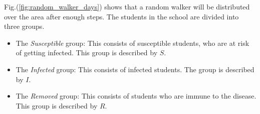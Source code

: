 \documentclass[%
twoside,                 %
final,                   %
chapterprefix=true,      %
open=right               %
10pt]{book}
\begin{document}
Fig.(\ref{fig:random_walker_days}) shows that a random walker will be distributed over the area after enough steps. The students in the school are divided into three groups. 
\begin{itemize}
\item The \emph{Susceptible} group: This consists of susceptible students, who are at risk of getting infected. This group is described by $S$. 

\item The \emph{Infected} group: This consists of infected students. The group is described by $I$. 

\item The \emph{Removed} group: This consists of students who are immune to the disease. This group is described by $R$. 
\end{itemize}
\end{document}
